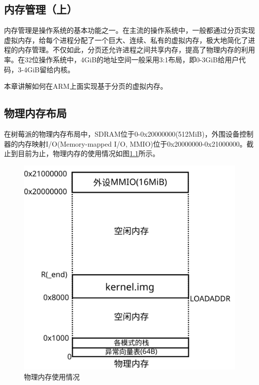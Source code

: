 \documentclass[main.tex]{subfiles}
\begin{document}
\ifxetex\else\begin{CJK*}{UTF8}{song}\fi

\chapter{内存管理（上）}
内存管理是操作系统的基本功能之一。在主流的操作系统中，一般都通过分页实现虚拟内存，给每个进程分配了一个巨大、连续、私有的虚拟内存，极大地简化了进程的内存管理。不仅如此，分页还允许进程之间共享内存，提高了物理内存的利用率。在32位操作系统中，4GiB的地址空间一般采用3:1布局，即0-3GiB给用户代码，3-4GiB留给内核。

\par
本章讲解如何在ARM上面实现基于分页的虚拟内存。

\section{物理内存布局}
在树莓派的物理内存布局中，SDRAM位于0-0x20000000(512MiB)，外围设备控制器的内存映射I/O(Memory-mapped I/O, MMIO)位于0x20000000-0x21000000。截止到目前为止，物理内存的使用情况如图\ref{figure:4-1}所示。

\begin{figure}[htp]
\centering
\includegraphics[scale=0.4]{figures/4-1}
\caption{物理内存使用情况}
\label{figure:4-1}
\end{figure}


\end{CJK*}
\end{document}
